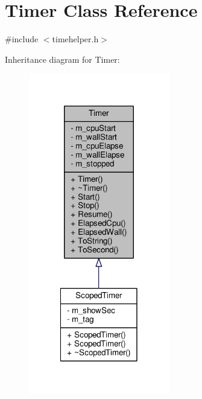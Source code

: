 \hypertarget{classTimer}{\section{Timer Class Reference}
\label{classTimer}
}


{\ttfamily \#include $<$timehelper.\-h$>$}



Inheritance diagram for Timer\-:
\nopagebreak
\begin{figure}[H]
\begin{center}
\leavevmode
\includegraphics[width=174pt]{classTimer__inherit__graph}
\end{center}
\end{figure}


